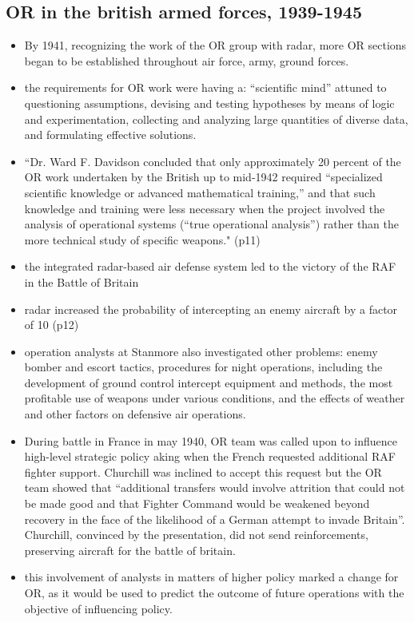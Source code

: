 \documentclass{article}
\begin{document}
\subsection{OR in the british armed forces, 1939-1945}
\begin{itemize}
\item By 1941, recognizing the work of the OR group with radar, more OR sections began to be established throughout air force, army, ground forces.
\item the requirements for OR work were having a:  ``scientific mind'' attuned to questioning assumptions, devising and testing hypotheses by means of logic and experimentation, collecting and analyzing large quantities of diverse data, and formulating effective solutions.
\item ``Dr. Ward F. Davidson concluded that only approximately 20 percent of the OR work undertaken by the British up to mid-1942 required ``specialized scientific knowledge or advanced mathematical training,'' and that such knowledge and training were less necessary when the project involved the analysis of operational systems (``true operational analysis'') rather than the more technical study of specific weapons." (p11)
\item the integrated radar-based air defense system led to the victory of the RAF in the Battle of Britain
\item radar increased the probability of intercepting an enemy aircraft by a factor of 10 (p12)
\item operation analysts at Stanmore also investigated other problems:  enemy bomber and escort tactics, procedures for night operations, including the development of ground control intercept equipment and methods, the most profitable use of weapons under various conditions, and the effects of weather and other factors on defensive air operations.
\item During battle in France in may 1940, OR team was called upon to influence high-level strategic policy aking when the French requested additional RAF fighter support. Churchill was inclined to accept this request but the OR team showed that ``additional transfers would involve attrition that could not be made good and that Fighter Command would be weakened beyond recovery in the face of the likelihood of a German attempt to invade Britain''. Churchill, convinced by the presentation, did not send reinforcements, preserving aircraft for the battle of britain.
\item this involvement of analysts in matters of higher policy marked a change for OR, as it would be used to predict the outcome of future operations with the objective of influencing policy.

\end{itemize}
\end{document}
